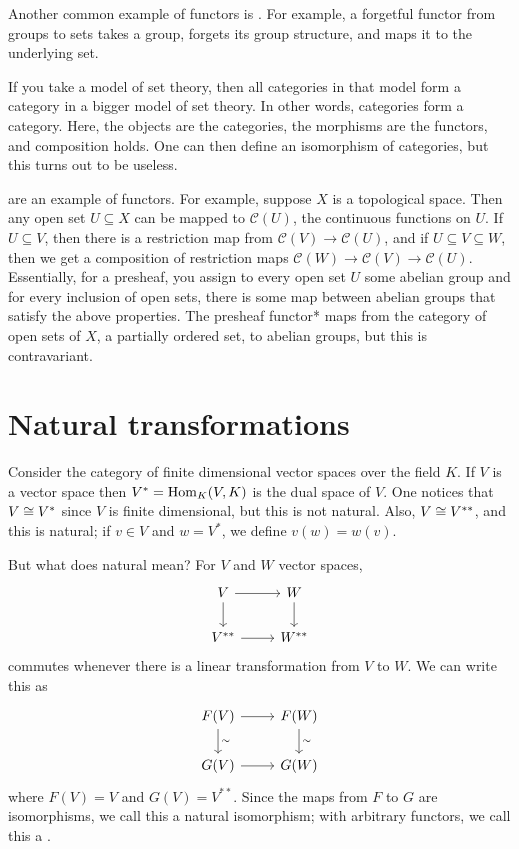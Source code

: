 \documentclass[11pt, twoside]{article}
\begin{document}
Another common example of functors is \href{https://en.wikipedia.org/wiki/Forgetful_functor}{}. For example, a forgetful functor from groups to sets takes a group, forgets its group structure, and maps it to the underlying set.

If you take a model of set theory, then all categories in that model form a category in a bigger model of set theory. In other words, categories form a category. Here, the objects are the categories, the morphisms are the functors, and composition holds. One can then define an isomorphism of categories, but this turns out to be useless. 

\href{https://en.wikipedia.org/wiki/Sheaf_(mathematics)#Presheaves}{} are an example of functors. For example, suppose $X$ is a topological space. Then any open set $U\subseteq X$ can be mapped to $\mathscr{C}(U)$, the continuous functions on $U$. If $U\subseteq V$, then there is a restriction map from $\mathscr{C}(V) \longrightarrow \mathscr{C}(U)$, and if $U\subseteq V\subseteq W$, then we get a composition of restriction maps $\mathscr{C}(W) \longrightarrow \mathscr{C}(V) \longrightarrow \mathscr{C}(U)$. Essentially, for a presheaf, you assign to every open set $U$ some abelian group and for every inclusion of open sets, there is some map between abelian groups that satisfy the above properties. The presheaf functor* maps from the category of open sets of $X$, a partially ordered set, to abelian groups, but this is contravariant.


\section{Natural transformations}
Consider the category of finite dimensional vector spaces over the field $K$. If $V$ is a vector space then $V^*=\operatorname{Hom}_K(V,K)$ is the dual space of $V$. One notices that $V\cong V^*$ since $V$ is finite dimensional, but this is not natural. Also, $V\cong V^{**}$, and this is natural; if $v\in V$ and $w = V^*$, we define $v(w) = w(v)$. 

But what does natural mean? For $V$ and $W$ vector spaces, 
\[
\begin{tikzcd}
V \arrow[r] \arrow[d] & W \arrow[d]\\ V^{**} \arrow[r] & W^{**}
\end{tikzcd}
\]
commutes whenever there is a linear transformation from $V$ to $W$. We can write this as
\[
\begin{tikzcd}
F(V) \arrow[r] \arrow[d, "\sim"] & F(W) \arrow[d,"\sim"]\\ G(V) \arrow[r] & G(W)
\end{tikzcd}
\]
where $F(V) = V$ and $G(V) = V^{**}$. Since the maps from $F$ to $G$ are isomorphisms, we call this a natural isomorphism; with arbitrary functors, we call this a \href{https://en.wikipedia.org/wiki/Natural_transformation}{}.
\end{document}
